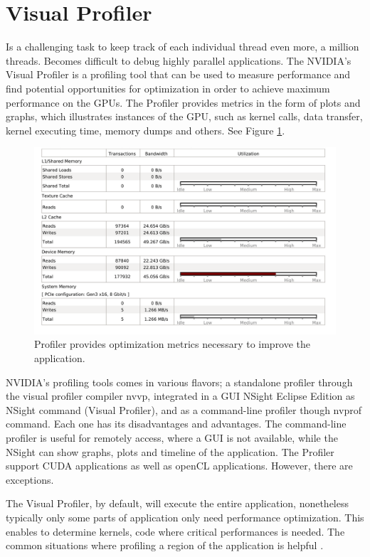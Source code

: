 \section{Visual Profiler}

Is a challenging task to keep track of each individual thread even more, a million threads. Becomes difficult to debug highly parallel applications. The NVIDIA's Visual Profiler is a profiling tool that can be used to measure performance and find potential opportunities for optimization in order to achieve maximum performance on the GPUs. The Profiler provides metrics in the form of plots and graphs, which illustrates instances of the GPU, such as kernel calls, data transfer, kernel executing time, memory dumps and others. See Figure \ref{fig:visualgraph}.

\begin{figure}[htbp]
	\centering
		\includegraphics[width=1.0\textwidth]{Figures/visualgraph.png}
		\smallskip
	\caption[Visual Profiler metrics]{Profiler provides optimization metrics necessary to improve the application.}
	\label{fig:visualgraph}
\end{figure}

NVIDIA's profiling tools comes in various flavors; a standalone profiler through the visual profiler compiler nvvp, integrated in a GUI NSight Eclipse Edition as NSight command (Visual Profiler), and as a command-line profiler though nvprof command. Each one has its disadvantages and advantages. The command-line profiler is useful for remotely access, where a GUI is not available, while the NSight can show graphs, plots and timeline of the application. The Profiler support CUDA applications as well as openCL applications. However, there are exceptions. 

The Visual Profiler, by default, will execute the entire application, nonetheless typically only some parts of application only need performance optimization. This enables to determine kernels, code where critical performances is needed. The common situations where profiling a region of the application is helpful \cite{tool}.

